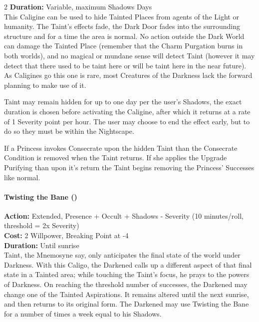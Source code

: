 \begin{multicols}{2}
\noindent \textbf{Duration:} Variable, maximum Shadows Days \\

\noindent This Caligine can be used to hide Tainted Places from agents of the Light or humanity. The Taint's effects fade, the Dark Door fades into the surrounding structure and for a time the area is normal. No action outside the Dark World can damage the Tainted Place (remember that the Charm Purgation burns in both worlds), and no magical or mundane sense will detect Taint (however it may detect that there used to be taint here or will be taint here in the near future). As Caligines go this one is rare, most Creatures of the Darkness lack the forward planning to make use of it.

Taint may remain hidden for up to one day per the user's Shadows, the exact duration is chosen before activating the Caligine, after which it returns at a rate of 1 Severity point per hour. The user may choose to end the effect early, but to do so they must be within the Nightscape.

If a Princess invokes Consecrate upon the hidden Taint than the Consecrate Condition is removed when the Taint returns. If she applies the Upgrade Purifying than upon it's return the Taint begins removing the Princess' Successes like normal.  \\

\paragraph*{Twisting the Bane (\textbullet\textbullet\textbullet)}

\noindent \textbf{Action:} Extended, Presence + Occult + Shadows - Severity (10 minutes/roll, threshold = 2x Severity)\\

\noindent \textbf{Cost:} 2 Willpower, Breaking Point at -4\\

\noindent \textbf{Duration:} Until sunrise \\

Taint, the Mnemosyne say, only anticipates the final state of the world under Darkness. With this Caligo, the Darkened calls up a different aspect of that final state in a Tainted area; while touching the Taint's focus, he prays to the powers of Darkness. On reaching the threshold number of successes, the Darkened may change one of the Tainted Aspirations. It remains altered until the next sunrise, and then returns to its original form. The Darkened may use Twisting the Bane for a number of times a week equal to his Shadows. \\


\end{multicols}

